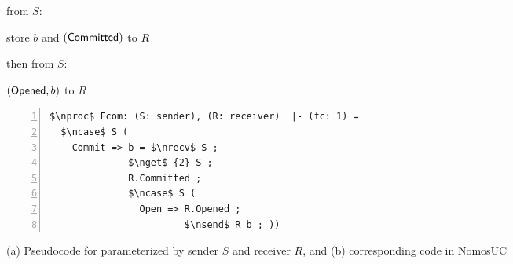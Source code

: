 \begin{figure}
\centering
\begin{minipage}{0.38\textwidth}
\begin{bbox}[title={Functionality $\F_{\m{com}}(S, R)$}]

\OnInput {} from $S$: 

\qquad store $b$ and \Send $(\mathsf{Committed})$ to $R$

then \OnInput {} from $S$: 

\qquad \Send $(\mathsf{Opened}, b)$ to $R$
\end{bbox}
\end{minipage}
\hspace{3em}
\begin{minipage}{0.5\textwidth}
\begin{lstlisting}[basicstyle=\scriptsize\BeraMonottFamily, frame=single, mathescape, numbers=left, xleftmargin=2em, xrightmargin=2em]
$\nproc$ Fcom: (S: sender), (R: receiver)  |- (fc: 1) =
  $\ncase$ S (
    Commit => b = $\nrecv$ S ;
              $\nget$ {2} S ;
              R.Committed ;
              $\ncase$ S (
                Open => R.Opened ;
                        $\nsend$ R b ; ))
\end{lstlisting}
\end{minipage}
\caption{(a) Pseudocode for \Fcom parameterized by sender $S$ and receiver $R$,
and (b) corresponding code in NomosUC}
\label{fig:fcomideal}
\vspace{-4mm}
\end{figure}
